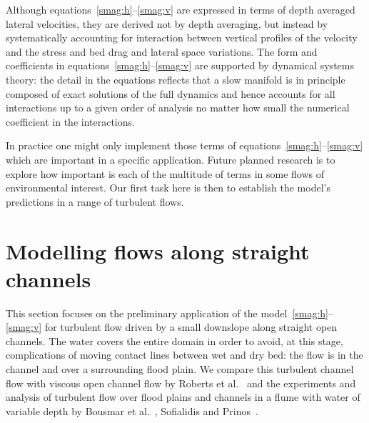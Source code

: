 \documentclass[twocolumn]{afmc_art}
\newcommand{\bq}{{\bar q}}
\begin{document}
Although equations~\eqref{smag:h}--\eqref{smag:v} are expressed in terms of depth averaged lateral velocities, they are derived not by depth averaging, but instead by systematically accounting for interaction between vertical profiles of the velocity and the stress and bed drag and lateral space variations. 
The form and coefficients in equations~\eqref{smag:h}--\eqref{smag:v} are supported by dynamical systems theory: the detail in the equations reflects that a slow manifold is in principle composed of exact solutions of the full dynamics and hence accounts for all interactions up to a given order of analysis no matter how small the numerical coefficient in the interactions.

In practice one might only implement those terms of equations~\eqref{smag:h}--\eqref{smag:v} which are important in a specific application.
Future planned research is to explore how important is each of the multitude of terms in some flows of environmental interest.
Our first task here is then to establish the model's predictions in a range of turbulent flows.

\section{Modelling flows along straight channels}




This section focuses on the preliminary application of the model~\eqref{smag:h}--\eqref{smag:v} for turbulent flow driven by a small downslope along straight open channels.
The water covers the entire domain in order to avoid, at this stage, complications of moving contact lines between wet and dry bed: the flow is in the channel and over a surrounding flood plain.
We compare this turbulent channel flow with viscous open channel flow by Roberts et al.~\cite{Robertsli2006} and the experiments and analysis of turbulent flow over flood plains and channels in a flume with water of variable depth by Bousmar et al.~\cite{Bousmar2002,Bousmar2003a}, Sofialidis and Prinos~\cite{Sofialidis:1999fk}.
\end{document}
